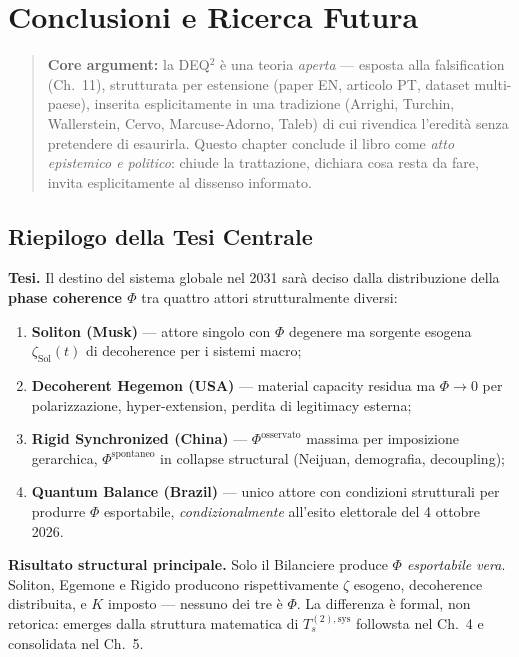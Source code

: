 \chapter{Conclusioni e Ricerca
Futura}\label{conclusioni-e-ricerca-futura}

\begin{quote}
\textbf{Core argument:} la DEQ$^2$ è una teoria \emph{aperta} ---
esposta alla falsification (Ch.~11), strutturata per estensione (paper
EN, articolo PT, dataset multi-paese), inserita esplicitamente in una
tradizione (Arrighi, Turchin, Wallerstein, Cervo, Marcuse-Adorno, Taleb)
di cui rivendica l'eredità senza pretendere di esaurirla. Questo
chapter conclude il libro come \emph{atto epistemico e politico}:
chiude la trattazione, dichiara cosa resta da fare, invita
esplicitamente al dissenso informato.
\end{quote}



\section{Riepilogo della Tesi
Centrale}\label{riepilogo-della-tesi-centrale}

\Proved{} \textbf{Tesi.} Il destino del sistema globale nel 2031 sarà
deciso dalla distribuzione della \textbf{phase coherence \(\Phi\)} tra
quattro attori strutturalmente diversi:

\begin{enumerate}
\def\labelenumi{\arabic{enumi}.}
\tightlist
\item
  \textbf{Soliton (Musk)} --- attore singolo con \(\Phi\) degenere ma
  sorgente esogena \(\zeta_{\text{Sol}}(t)\) di decoherence per i sistemi
  macro;
\item
  \textbf{Decoherent Hegemon (USA)} --- material capacity residua ma
  \(\Phi \to 0\) per polarizzazione, hyper-extension, perdita di
  legitimacy esterna;
\item
  \textbf{Rigid Synchronized (China)} --- \(\Phi^{\text{osservato}}\)
  massima per imposizione gerarchica, \(\Phi^{\text{spontaneo}}\) in
  collapse structural (Neijuan, demografia, decoupling);
\item
  \textbf{Quantum Balance (Brazil)} --- unico attore con
  condizioni strutturali per produrre \(\Phi\) esportabile,
  \emph{condizionalmente} all'esito elettorale del 4 ottobre 2026.
\end{enumerate}

\Hypoth{} \textbf{Risultato structural principale.} Solo il Bilanciere
produce \emph{\(\Phi\) esportabile vera}. Soliton, Egemone e Rigido
producono rispettivamente \(\zeta\) esogeno, decoherence distribuita, e
\(K\) imposto --- nessuno dei tre è \(\Phi\). La differenza è formal,
non retorica: emerges dalla struttura matematica di
\(T_s^{(2),\text{sys}}\) followsta nel Ch.~4 e consolidata nel Ch.~5.



